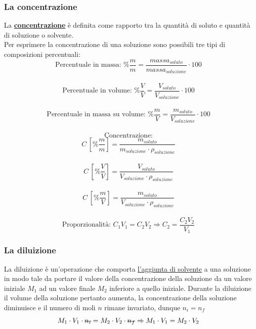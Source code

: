 \documentclass{article}
\begin{document}
\subsubsection{La concentrazione}
La \textbf{\underline{concentrazione}} è definita come rapporto tra la quantità di soluto 
e quantità di soluzione o solvente. \\
Per esprimere la concentrazione di una soluzione sono possibili tre tipi di composizioni percentuali:
\begin{equation*}
    \text{Percentuale in massa: }
    \%\frac{m}{m} = \frac{massa_{soluto}}{massa_{soluzione}}\cdot100
\end{equation*}\\
\begin{equation*}
    \text{Percentuale in volume: }
    \%\frac{V}{V} = \frac{V_{soluto}}{V_{soluzione}}\cdot100
\end{equation*}\\
\begin{equation*}
    \text{Percentuale in massa su volume: }
    \%\frac{m}{V} = \frac{m_{soluto}}{V_{soluzione}}\cdot100
\end{equation*}\\
\begin{equation*}
    \text{Concentrazione:}
\end{equation*} 
\begin{equation*}
    C\ [\%\frac{m}{m}] = \frac{m_{soluto}}{m_{soluzione}\cdot\rho_{soluzione}}
\end{equation*}\\
\begin{equation*}
    C\ [\%\frac{V}{V}] = \frac{V_{soluto}}{V_{soluzione}\cdot\rho_{soluzione}}
\end{equation*}\\
\begin{equation*}
    C\ [\%\frac{m}{V}] = \frac{m_{soluto}}{V_{soluzione}\cdot\rho_{soluzione}}
\end{equation*}\\
\begin{equation*}
    \text{Proporzionalità: } C_1V_1=C_2V_2 \Rightarrow C_2=\frac{C_2V_2}{V_1}
\end{equation*}

\subsubsection{La diluizione}
La diluizione è un'operazione che comporta \underline{l'aggiunta di solvente} a una soluzione
in modo tale da portare il valore della concentrazione della soluzione da un valore iniziale
$M_1$ ad un valore finale $M_2$ inferiore a quello iniziale.
Durante la diluizione il volume della soluzione pertanto aumenta, la concentrazione
della soluzione diminuisce e il numero di moli $n$ rimane invariato, dunque $n_i=n_f$
\begin{equation*}
    M_1 \cdot V_1 \cdot \text{\st{$n_i$}} = M_2 \cdot V_2 \cdot \text{\st{$n_f$}}
    \Rightarrow  M_1 \cdot V_1 = M_2 \cdot V_2
\end{equation*}
\end{document}
